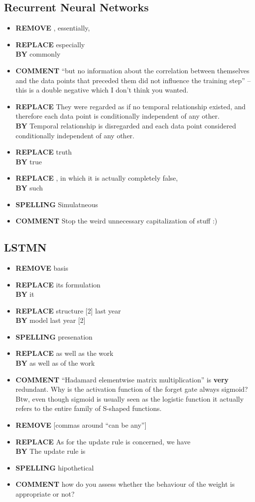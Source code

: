 \documentclass[11pt]{scrartcl} %
\begin{document}
\subsection*{Recurrent Neural Networks}
\begin{itemize}
	\item {\bf REMOVE} , essentially,
	\item {\bf REPLACE} especially \\{\bf BY} commonly
	\item {\bf COMMENT} ``but no information about the correlation between themselves and the data points that preceded them did not influence the training step'' -- this is a double negative which I don't think you wanted.
	\item {\bf REPLACE} They were regarded as if no temporal relationship existed, and therefore each data point is conditionally independent of any other. \\{\bf BY} Temporal relationship is disregarded and  each data point considered conditionally independent of any other.
	\item {\bf REPLACE} truth \\{\bf BY} true
	\item {\bf REPLACE} , in which it is actually completely false, \\{\bf BY} such
	\item {\bf SPELLING} Simulatneous
	\item {\bf COMMENT} Stop the weird unnecessary capitalization of stuff :)
\end{itemize}

\subsection*{LSTMN}
\begin{itemize}
	\item {\bf REMOVE} basis
	\item {\bf REPLACE} its formulation \\{\bf BY} it
	\item {\bf REPLACE} structure [2] last year \\{\bf BY} model last year [2]
	\item {\bf SPELLING} presenation
	\item {\bf REPLACE} as well as the work \\{\bf BY} as well as of the work
	\item {\bf COMMENT} ``Hadamard elementwise matrix multiplication'' is {\bf very} redundant. Why is the activation function of the forget gate always sigmoid? Btw, even though sigmoid is usually seen as the logistic function it actually refers to the entire family of S-shaped functions.
	\item {\bf REMOVE} [commas around ``can be any'']
	\item {\bf REPLACE} As for the update rule is concerned, we have \\{\bf BY} The update rule is
	\item {\bf SPELLING} hipothetical
	\item {\bf COMMENT} how do you assess whether the behaviour of the weight is appropriate or not?
\end{itemize}
\end{document}

